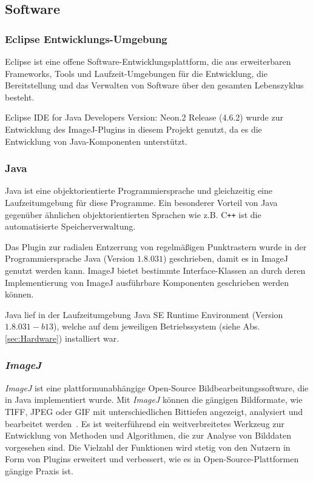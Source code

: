 \subsection{Software}\label{sec:Software}

\subsubsection{Eclipse Entwicklungs-Umgebung}
Eclipse ist eine offene Software-Entwicklungsplattform, die aus erweiterbaren Frameworks, Tools und Laufzeit-Umgebungen für die Entwicklung, die Bereitstellung und das Verwalten von Software über den gesamten Lebenszyklus besteht.
\cite{eclipse}

Eclipse IDE for Java Developers Version: Neon.2 Release (4.6.2) wurde zur Entwicklung des ImageJ-Plugins in diesem Projekt genutzt, da es die Entwicklung von Java-Komponenten unterstützt. 


\subsubsection{Java}
Java ist eine objektorientierte Programmiersprache und gleichzeitig eine Laufzeitumgebung für diese Programme. Ein besonderer Vorteil von Java gegenüber ähnlichen objektorientierten Sprachen wie z.B. C\texttt{++} ist die automatisierte Speicherverwaltung. \cite{java}

Das Plugin zur radialen Entzerrung von regelmäßigen Punktrastern wurde in der Programmiersprache Java (Version $ 1.8.0 31 $) geschrieben, damit es in ImageJ genutzt werden kann. ImageJ bietet bestimmte Interface-Klassen an durch deren Implementierung von ImageJ ausführbare Komponenten geschrieben werden können.

Java lief in der Laufzeitumgebung Java SE Runtime Environment (Version $ 1.8.0 31-b13 $), welche auf dem jeweiligen Betriebssystem (siehe Abs. \ref{sec:Hardware}) installiert war.

\subsubsection{\textit{ImageJ}}

\textit{ImageJ} ist eine plattformunabhängige Open-Source Bildbearbeitungssoftware, die in Java implementiert wurde. Mit \textit{ImageJ} können die gängigen Bildformate, wie TIFF, JPEG oder GIF mit unterschiedlichen Bittiefen angezeigt, analysiert und bearbeitet werden~\cite{Collins_ImageJ}. Es ist weiterführend ein weitverbreitetes Werkzeug zur Entwicklung von Methoden und Algorithmen, die zur Analyse von Bilddaten vorgesehen sind. Die Vielzahl der Funktionen wird stetig von den Nutzern in Form von Plugins erweitert und verbessert, wie es in Open-Source-Plattformen gängige Praxis ist.

